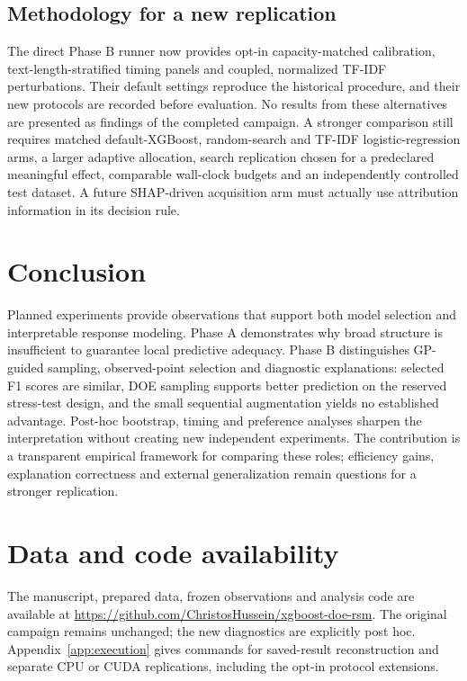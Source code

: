 \documentclass[12pt,a4paper]{article}
\begin{document}
\subsection{Methodology for a new replication}
The direct Phase B runner now provides opt-in capacity-matched calibration, text-length-stratified timing panels and coupled, normalized TF-IDF perturbations. Their default settings reproduce the historical procedure, and their new protocols are recorded before evaluation. No results from these alternatives are presented as findings of the completed campaign. A stronger comparison still requires matched default-XGBoost, random-search and TF-IDF logistic-regression arms, a larger adaptive allocation, search replication chosen for a predeclared meaningful effect, comparable wall-clock budgets and an independently controlled test dataset. A future SHAP-driven acquisition arm must actually use attribution information in its decision rule.
\section{Conclusion}
Planned experiments provide observations that support both model selection and interpretable response modeling. Phase A demonstrates why broad structure is insufficient to guarantee local predictive adequacy. Phase B distinguishes GP-guided sampling, observed-point selection and diagnostic explanations: selected F1 scores are similar, DOE sampling supports better prediction on the reserved stress-test design, and the small sequential augmentation yields no established advantage. Post-hoc bootstrap, timing and preference analyses sharpen the interpretation without creating new independent experiments. The contribution is a transparent empirical framework for comparing these roles; efficiency gains, explanation correctness and external generalization remain questions for a stronger replication.
\section{Data and code availability}
The manuscript, prepared data, frozen observations and analysis code are available at \url{https://github.com/ChristosHussein/xgboost-doe-rsm}. The original campaign remains unchanged; the new diagnostics are explicitly post hoc. Appendix~\ref{app:execution} gives commands for saved-result reconstruction and separate CPU or CUDA replications, including the opt-in protocol extensions.

\clearpage
\appendix
\end{document}
